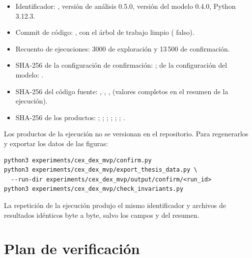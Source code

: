 \begin{itemize}
  \item Identificador: \code{\RunID}, versión de análisis 0.5.0, versión del modelo 0.4.0, Python 3.12.3.
  \item Commit de código: , con el árbol de trabajo limpio ( falso).
  \item Recuento de ejecuciones: 3000 de exploración y 13\,500 de confirmación.
  \item SHA-256 de la configuración de confirmación: ; de la configuración del modelo: .
  \item SHA-256 del código fuente:  ,  ,  ,   (valores completos en el resumen de la ejecución).
  \item SHA-256 de los productos:  ;  ;  ;  ;  ;  ;  .
\end{itemize}

Los productos de la ejecución no se versionan en el repositorio. Para regenerarlos y exportar los datos de las figuras:

\begin{verbatim}
python3 experiments/cex_dex_mvp/confirm.py
python3 experiments/cex_dex_mvp/export_thesis_data.py \
  --run-dir experiments/cex_dex_mvp/output/confirm/<run_id>
python3 experiments/cex_dex_mvp/check_invariants.py
\end{verbatim}

La repetición de la ejecución produjo el mismo identificador y archivos de resultados idénticos byte a byte, salvo los campos  y  del resumen.

\section{Plan de verificación}
\label{sec:verificacion}

